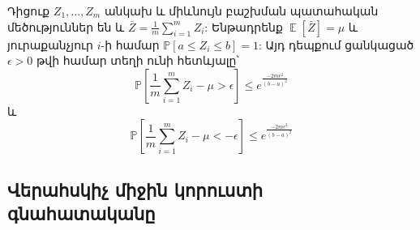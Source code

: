 \documentclass[12pt]{article}
\DeclareMathOperator*{\E}{\mathbb{E}}
\begin{document}
\begin{lemma}
\label{hofding_inq}
Դիցուք $Z_1, ..., Z_m$ անկախ և միևնույն բաշխման պատահական մեծություններ են և $\bar{Z} = \frac{1}{m}\sum_{i=1}^m{Z_i}$: Ենթադրենք $\E[\bar{Z}] = \mu$ և յուրաքանչյուր $i$-ի համար $\mathbb{P}[a \leq Z_i \leq b] = 1$: Այդ դեպքում ցանկացած $\epsilon > 0$ թվի համար տեղի ունի հետևյալը՝
$$\mathbb{P}\left[ \frac{1}{m}\sum_{i=1}^m{Z_i}-\mu > \epsilon \right] \leq e^{\frac{-2m\epsilon^2}{(b-a)^2}}$$ 
և
$$\mathbb{P}\left[ \frac{1}{m}\sum_{i=1}^m{Z_i}-\mu < -\epsilon \right] \leq e^{\frac{-2m\epsilon^2}{(b-a)^2}}$$ 
\end{lemma}

\subsection*{\hfill Վերահսկիչ միջին կորուստի գնահատականը \hfill} \noindent
{}
{}
\end{document}
